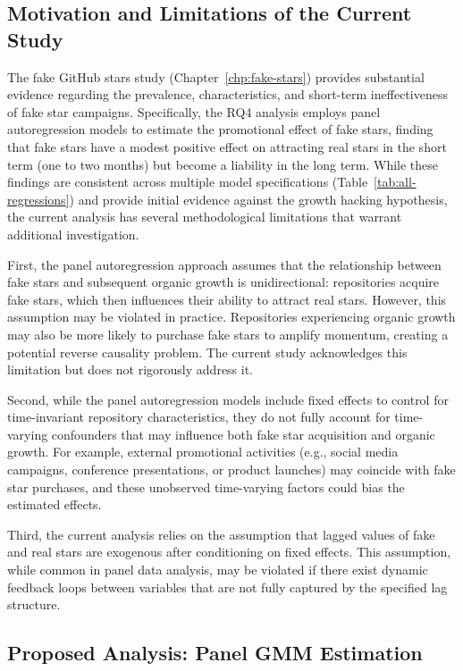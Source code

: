\subsection{Motivation and Limitations of the Current Study}

The fake GitHub stars study (Chapter~\ref{chp:fake-stars}) provides substantial evidence regarding the prevalence, characteristics, and short-term ineffectiveness of fake star campaigns.
Specifically, the RQ4 analysis employs panel autoregression models to estimate the promotional effect of fake stars, finding that fake stars have a modest positive effect on attracting real stars in the short term (one to two months) but become a liability in the long term.
While these findings are consistent across multiple model specifications (Table~\ref{tab:all-regressions}) and provide initial evidence against the growth hacking hypothesis, the current analysis has several methodological limitations that warrant additional investigation.

First, the panel autoregression approach assumes that the relationship between fake stars and subsequent organic growth is unidirectional: repositories acquire fake stars, which then influences their ability to attract real stars.
However, this assumption may be violated in practice.
Repositories experiencing organic growth may also be more likely to purchase fake stars to amplify momentum, creating a potential reverse causality problem.
The current study acknowledges this limitation but does not rigorously address it.

Second, while the panel autoregression models include fixed effects to control for time-invariant repository characteristics, they do not fully account for time-varying confounders that may influence both fake star acquisition and organic growth.
For example, external promotional activities (e.g., social media campaigns, conference presentations, or product launches) may coincide with fake star purchases, and these unobserved time-varying factors could bias the estimated effects.

Third, the current analysis relies on the assumption that lagged values of fake and real stars are exogenous after conditioning on fixed effects.
This assumption, while common in panel data analysis, may be violated if there exist dynamic feedback loops between variables that are not fully captured by the specified lag structure.

\subsection{Proposed Analysis: Panel GMM Estimation}

